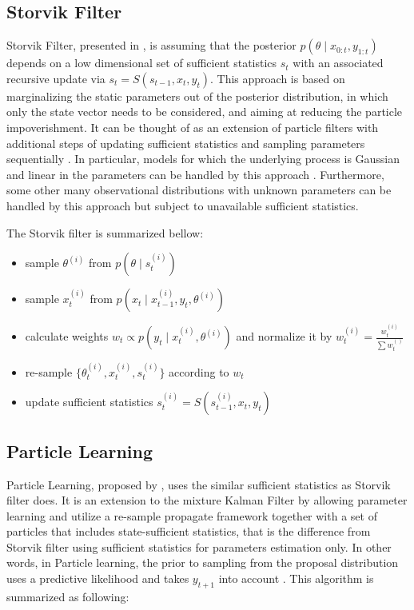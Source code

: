 \subsection{Storvik Filter}


Storvik Filter, presented in \cite{storvik2002particle}, is assuming that the posterior $p(\theta\mid x_{0:t},y_{1:t})$ depends on a low dimensional set of sufficient statistics $s_t$ with an associated recursive update via $s_t=S(s_{t-1},x_t,y_t)$. This approach is based on marginalizing the static parameters out of the posterior distribution, in which only the state vector needs to be considered, and aiming at reducing the particle impoverishment. It can be thought of as an extension of particle filters with additional steps of updating sufficient statistics and sampling parameters sequentially \cite{lopes2011particle}. In particular, models for which the underlying process is Gaussian and linear in the parameters can be handled by this approach \cite{storvik2002particle}. Furthermore, some other many observational distributions with unknown parameters can be handled by this approach but subject to unavailable sufficient statistics. 

The Storvik filter is summarized bellow:
\begin{itemize}
\item sample $\theta^{(i)}$ from $p(\theta\mid s_t^{(i)})$
\item sample $x_t^{(i)}$ from $p(x_t\mid x_{t-1}^{(i)},y_{t},\theta^{(i)} )$
\item calculate weights $w_t \propto p(y_{t}\mid x_t^{(i)}, \theta^{(i)})$ and normalize it by $w_t^{(i)}=\frac{ w_t^{(i)} }{ \sum w_t^{()}}$
\item re-sample $\{ \theta_t^{(i)},x_t^{(i)},s_t^{(i)}  \}$ according to $w_t$
\item update sufficient statistics $s_t^{(i)}=S(s_{t-1}^{(i)},x_t,y_t)$ 
\end{itemize}



\subsection{Particle Learning}

Particle Learning, proposed by \cite{carvalho2010particle}, uses the similar sufficient statistics as Storvik filter does. It is an extension to the mixture Kalman Filter \cite{chen2000mixture} by allowing parameter learning and utilize a re-sample propagate framework together with a set of particles that includes state-sufficient statistics, that is the difference from Storvik filter using sufficient statistics for parameters estimation only. In other words, in Particle learning, the prior to sampling from the proposal distribution uses a predictive likelihood and takes $y_{t+1}$ into account \cite{vieira2016online}. This algorithm is summarized as following: 

